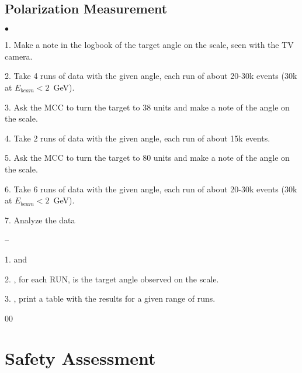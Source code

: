 {\subsection {Polarization Measurement }
\label{sec:polmeas}

\begin{list}{$\bullet$}{\setlength{\itemsep}{0.cm}}
  \item[1.] Make a note in the logbook of the target angle on the scale, 
            seen with the TV camera.  
  \item[2.] Take 4 runs of data with the given angle, each run of about 20-30k
            events (30k at $E_{beam}<2$~GeV).
  \item[3.] Ask the MCC to turn the target to 38 units 
            and make a note of the angle on the scale.
  \item[4.] Take 2 runs of data with the given angle, each run of about 15k events.
  \item[5.] Ask the MCC to turn the target to 80 units
            and make a note of the angle on the scale.
  \item[6.] Take 6 runs of data with the given angle, each run of about 20-30k
            events (30k at $E_{beam}<2$~GeV).
  \item[7.] Analyze the data
        \begin{list}{--}{\setlength{\itemsep}{0.cm}}
             \item[1.]  and
             \item[2.] , for each RUN,
                        is the target angle observed on the scale.
             \item[3.] , print a table
                       with the results for a given range of runs.
        \end{list}
\end{list}

}
\begin{safetyen}{0}{0}
\section {Safety Assessment}
\label{sec:moller_safety}
\end{safetyen}


